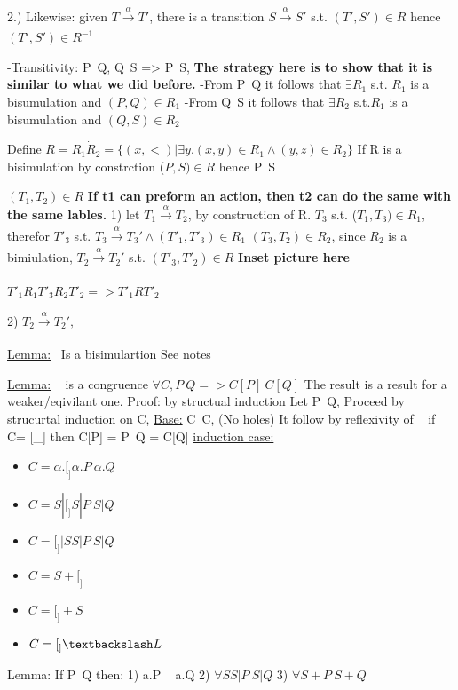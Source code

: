 \documentclass[a4paper,10pt,titlepage]{report}
\begin{document}
2.) Likewise: given $T \xrightarrow[\text{}]{{ {\alpha} }} T'$, there is a transition $S \xrightarrow[\text{}]{{ {\alpha} }} S'$ s.t. $(T', S') \in R$ hence $(T', S') \in R^{-1}$

-Transitivity: P~Q, Q~S => P~S, 
	\textbf{The strategy here is to show that it is similar to what we did before.}
	-From P~Q it follows that $\exists R_1$ s.t. $R_1$ is a bisumulation and $(P,Q) \in R_1$
	-From Q~S it follows that $\exists R_2$ s.t.$ R_1$ is a bisumulation and $(Q,S) \in R_2$

	Define $R = R_1 \dot R_2 = \{(x,<) | \exists y. (x,y) \in R_1 \wedge (y,z) \in R_2 \}$
	If R is a bisimulation by constrction ($P,S) \in R$ hence P~S
	


$(T_1, T_2) \in R$
\textbf{If t1 can preform an action, then t2 can do the same with the same lables.}
1) let $T_1 \xrightarrow[\text{}]{{ {\alpha} }} T_2$, by construction of R. $T_3$ s.t. 
($T_1, T_3) \in R_1$, therefor $T'_3$ s.t. $T_3 \xrightarrow[\text{}]{{ {\alpha} }} T_3' \wedge (T'_1, T'_3) \in R_1$
$(T_3, T_2) \in R_2$, since $R_2$ is a bimiulation, $T_2 \xrightarrow[\text{}]{{ {\alpha} }} T_2'$ s.t. $(T'_3, T'_2) \in R$
\textbf{Inset picture here}

$T'_1 R_1 T'_3 R_2 T'_2 => T'_1 R T'_2$

2) $T_2 \xrightarrow[\text{}]{{ \alpha }} T_2', $

\underline{Lemma:} ~Is a bisimulartion
	See notes
	
\underline{Lemma:} ~ is a congruence
	$\forall C, P~Q => C[P] ~C[Q]$
	The result is a result for a weaker/eqivilant one.
	Proof: by structual induction
		Let P~Q, Proceed by strucurtal induction on C,
		\underline{Base:} C~C, (No holes) It follow by reflexivity of ~
			if C= [\_] then C[P] = P~Q = C[Q]
		\underline{induction case:}
			\begin{itemize}
			\item $C = \alpha.[_] \alpha.P ~ \alpha.Q$
			\item $C = S|[_] S|P ~S|Q$
			\item $C = [_]|S S|P ~S|Q$
			\item $C = S+[_]$
			\item $C = [_]+S$
			\item $C = [_]\textbackslash L$
			\end{itemize}

	Lemma: If P~Q then:
	1) a.P ~ a.Q
	2) $\forall S S|P ~S|Q$
	3) $\forall S+P ~ S+Q$
	
\end{document}
